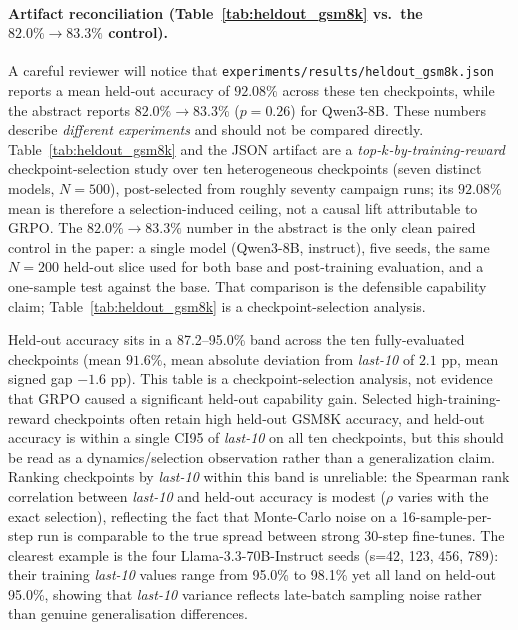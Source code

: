 \documentclass{article}
\begin{document}
\paragraph{Artifact reconciliation (Table~\ref{tab:heldout_gsm8k} vs.\ the $82.0\%\!\to\!83.3\%$ control).}
A careful reviewer will notice that \texttt{experiments/results/heldout\_gsm8k.json}
reports a mean held-out accuracy of $92.08\%$ across these ten checkpoints,
while the abstract reports $82.0\%\!\to\!83.3\%$ ($p=0.26$) for Qwen3-8B.
These numbers describe \emph{different experiments} and should not be compared
directly.  Table~\ref{tab:heldout_gsm8k} and the JSON artifact are a
\emph{top-$k$-by-training-reward} checkpoint-selection study over ten
heterogeneous checkpoints (seven distinct models, $N=500$), post-selected from
roughly seventy campaign runs; its $92.08\%$ mean is therefore a
selection-induced ceiling, not a causal lift attributable to GRPO.  The
$82.0\%\!\to\!83.3\%$ number in the abstract is the only clean paired control
in the paper: a single model (Qwen3-8B, instruct), five seeds, the same
$N{=}200$ held-out slice used for both base and post-training evaluation, and
a one-sample test against the base.  That comparison is the defensible
capability claim; Table~\ref{tab:heldout_gsm8k} is a checkpoint-selection analysis.

\noindent Held-out accuracy sits in a 87.2--95.0\% band across the
ten fully-evaluated checkpoints (mean $91.6\%$, mean absolute deviation
from \emph{last-10} of $2.1$ pp, mean signed gap $-1.6$ pp).  This table is a
checkpoint-selection analysis, not evidence that GRPO caused a significant
held-out capability gain.  Selected high-training-reward checkpoints often
retain high held-out GSM8K accuracy, and held-out accuracy is within a single
CI95 of \emph{last-10} on all ten checkpoints, but this should be read as a
dynamics/selection observation rather than a generalization claim.  Ranking
checkpoints by \emph{last-10} within this band is
unreliable: the Spearman rank correlation between \emph{last-10} and
held-out accuracy is modest ($\rho$ varies with the exact selection), reflecting
the fact that Monte-Carlo noise on a 16-sample-per-step run is comparable to the
true spread between strong 30-step fine-tunes. The clearest example is the four
Llama-3.3-70B-Instruct seeds (s=42, 123, 456, 789): their training
\emph{last-10} values range from 95.0\% to 98.1\% yet all land on held-out
95.0\%, showing that \emph{last-10} variance reflects late-batch sampling noise
rather than genuine generalisation differences.
\end{document}
